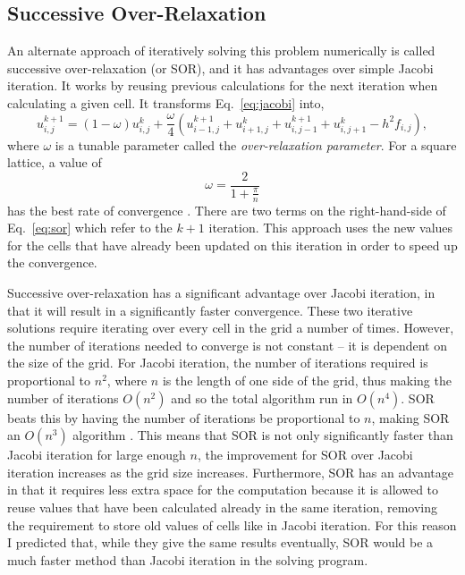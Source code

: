 \subsection{Successive Over-Relaxation}

An alternate approach of iteratively solving this problem numerically is called successive over-relaxation (or SOR), and
it has advantages over simple Jacobi iteration. It works by reusing previous calculations for the next iteration when
calculating a given cell. It transforms Eq.~\ref{eq:jacobi} into,
\begin{equation} \label{eq:sor}
	u_{i,j}^{k+1} = (1-\omega) u_{i,j}^{k} + \frac{\omega}{4}\left(u_{i-1,j}^{k+1} + u_{i+1,j}^{k} + u_{i,j-1}^{k+1} + u_{i,j+1}^{k} - h^2 f_{i,j}\right),
\end{equation}
where $\omega$ is a tunable parameter called the \textit{over-relaxation parameter}. For a square lattice, a value of
$$\omega = \frac{2}{1+\frac{\pi}{n}}$$
has the best rate of convergence \cite{poisson-relax}. There are two terms on the right-hand-side of Eq.~\ref{eq:sor} which refer to the
$k+1$ iteration. This approach uses the new values for the cells that have already been updated on this iteration
in order to speed up the convergence.

Successive over-relaxation has a significant advantage over Jacobi iteration, in that it will result in a significantly faster convergence.
These two iterative solutions require iterating over every cell in the grid a number of times. However, the number of iterations needed to
converge is not constant -- it is dependent on the size of the grid. For Jacobi iteration, the number of iterations required is
proportional to $n^2$, where $n$ is the length of one side of the grid, thus making the number of iterations $O(n^2)$ and so the total
algorithm run in $O(n^4)$. SOR beats this by having the number of iterations be proportional to $n$, making SOR an $O(n^3)$ algorithm \cite{poisson-relax}. This means
that SOR is not only significantly faster than Jacobi iteration for large enough $n$, the improvement for SOR over Jacobi iteration increases
as the grid size increases. Furthermore, SOR has an advantage in that it requires less extra space for the computation because it is allowed
to reuse values that have been calculated already in the same iteration, removing the requirement to store old values of cells like in Jacobi
iteration. For this reason I predicted that, while they give the same results eventually, SOR would be a much faster method than Jacobi
iteration in the solving program.






